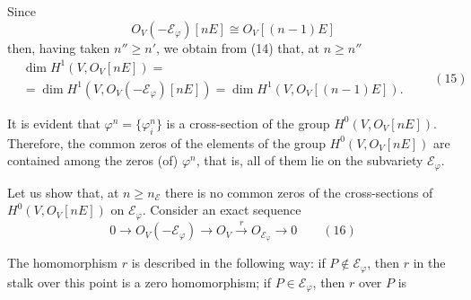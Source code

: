 
Since
\[
O_V(-\mathcal E_{\varphi})[nE]\cong O_V[(n-1)E]
\]
then, having taken $n''\geq n'$, we obtain from (14) that, at $n\geq n''$
\[
\begin{aligned}
&\dim H^1(V,O_V[nE])=\\
&=\dim H^1(V,O_V(-\mathcal E_{\varphi})[nE])=\dim H^1(V,O_V[(n-1)E]).
\end{aligned}
\qquad(15)
\]

It is evident that $\varphi^{n}=\{\varphi_i^{n}\}$ is a cross-section of the group $H^0(V,O_V[nE])$. Therefore, the common zeros of the elements of the group $H^0(V,O_V[nE])$ are contained among the zeros (of) $\varphi^n$, that is, all of them lie on the subvariety $\mathcal E_{\varphi}$.

Let us show that, at $n\geq n_{\mathcal E}$ there is no common zeros of the cross-sections of $H^0(V,O_V[nE])$ on $\mathcal E_{\varphi}$. Consider an exact sequence
\[
0\to O_V(-\mathcal E_{\varphi})\to O_V\xrightarrow{r}O_{\mathcal E_{\varphi}}\to 0\qquad(16)
\]

The homomorphism $r$ is described in the following way: if $P\notin\mathcal E_{\varphi}$, then $r$ in the stalk over this point is a zero homomorphism; if $P\in\mathcal E_{\varphi}$, then $r$ over $P$ is
